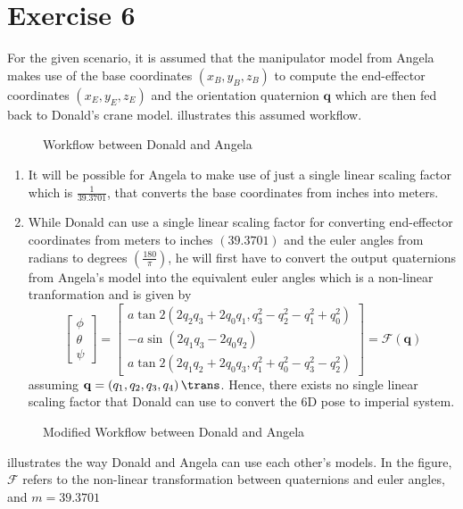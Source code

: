 \section{Exercise 6}
For the given scenario, it is assumed that the manipulator model from Angela makes use of the base coordinates $\left(x_B,y_B,z_B\right)$ to compute the end-effector coordinates $\left(x_E,y_E,z_E\right)$ and the orientation quaternion $\mathbf{q}$ which are then fed back to Donald's crane model.  illustrates this assumed workflow.
\begin{figure}[h!]
	
	\caption{Workflow between Donald and Angela}
	\label{fig:workflow}
\end{figure}
\begin{enumerate}
	\item It will be possible for Angela to make use of just a single linear scaling factor which is $\frac{1}{39.3701}$, that converts the base coordinates from inches into meters.
	\item While Donald can use a single linear scaling factor for converting end-effector coordinates from meters to inches $\left(39.3701\right)$ and the euler angles from radians to degrees $\left(\frac{180}{\pi}\right)$, he will first have to convert the output quaternions from Angela's model into the equivalent euler angles which is a non-linear tranformation and is given by
	\begin{equation*}
		\left[\begin{array}{l}
			\phi \\
			\theta \\
			\psi
		\end{array}\right]=\left[\begin{array}{c}
			a \tan 2\left(2 q_2 q_3+2 q_0 q_1 , q_3^2-q_2^2-q_1^2+q_0^2\right) \\
			-a \sin \left(2 q_1 q_3-2 q_0 q_2\right) \\
			a \tan 2\left(2 q_1 q_2+2 q_0 q_3, q_1^2+q_0^2-q_3^2-q_2^2\right)
		\end{array}\right] = \mathcal{F}\left(\mathbf{q}\right)
	\end{equation*}
	assuming $\mathbf{q} = \left(q_1, q_2, q_3, q_4\right)\trans$. Hence, there exists no single linear scaling factor that Donald can use to convert the 6D pose to imperial system.
\end{enumerate}

\begin{figure}[h!]
	
	\caption{Modified Workflow between Donald and Angela}
	\label{fig:modworkflow}
\end{figure}
 illustrates the way Donald and Angela can use each other's models. In the figure, $\mathcal{F}$ refers to the non-linear transformation between quaternions and euler angles, and $m = 39.3701$